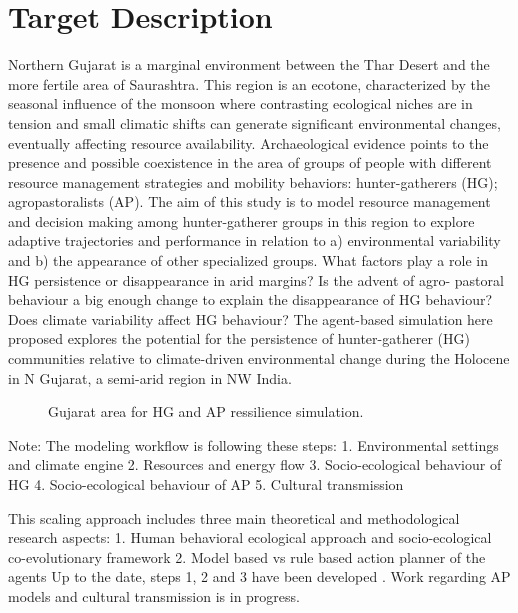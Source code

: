 \documentclass[11pt,oneside,a4paper,openright]{report}
\begin{document}
	

\section{Target Description}

Northern Gujarat is a marginal environment between the Thar Desert and the more fertile area of
Saurashtra. This region is an ecotone, characterized by the seasonal influence of the monsoon where
contrasting ecological niches are in tension and small climatic shifts can generate significant
environmental changes, eventually affecting resource availability. Archaeological evidence points to
the presence and possible coexistence in the area of groups of people with different resource
management strategies and mobility behaviors: hunter-gatherers (HG); agropastoralists (AP).
The aim of this study is to model resource management and decision making among hunter-gatherer
groups in this region to explore adaptive trajectories and performance in relation to a) environmental
variability and b) the appearance of other specialized groups.
What factors play a role in HG persistence or disappearance in arid margins? Is the advent of agro-
pastoral behaviour a big enough change to explain the disappearance of HG behaviour? Does climate
variability affect HG behaviour?
The agent-based simulation here proposed explores the potential for the persistence of hunter-gatherer
(HG) communities relative to climate-driven environmental change during the Holocene in N Gujarat, a
semi-arid region in NW India.



\begin{figure}[h!]
\centering
\setlength\fboxsep{0pt}
\setlength\fboxrule{0.5pt}
\caption{ Gujarat area for HG and AP ressilience simulation.}
\label{fig:jamt_1}
\end{figure}


Note:
The modeling workflow is following these steps:
1. Environmental settings and climate engine
2. Resources and energy flow
3. Socio-ecological behaviour of HG
4. Socio-ecological behaviour of AP
5. Cultural transmission

This scaling approach includes three main theoretical and methodological research aspects:
1. Human behavioral ecological approach and socio-ecological co-evolutionary framework
2. Model based vs rule based action planner of the agents
Up to the date, steps 1, 2 and 3 have been developed . Work regarding AP models and cultural
transmission is in progress.
\end{document}
